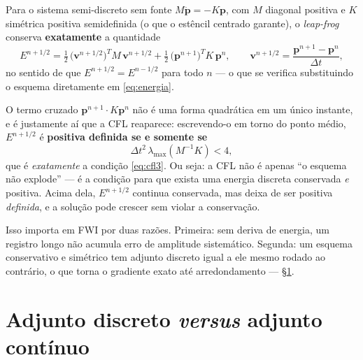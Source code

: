 \documentclass[11pt,a4paper,oneside]{report}
\begin{document}
\begin{derivacao}
Para o sistema semi-discreto sem fonte $M\ddot{\mathbf{p}} = -K\mathbf{p}$,
com $M$ diagonal positiva e $K$ sim\'etrica positiva semidefinida (o que o
est\^encil centrado garante), o \emph{leap-frog} conserva \textbf{exatamente} a
quantidade
\begin{equation}
E^{n+1/2}
 = \tfrac12\,\bigl(\mathbf{v}^{n+1/2}\bigr)^{T} M\,\mathbf{v}^{n+1/2}
 + \tfrac12\,\bigl(\mathbf{p}^{n+1}\bigr)^{T} K\,\mathbf{p}^{n},
\qquad
\mathbf{v}^{n+1/2} = \frac{\mathbf{p}^{n+1}-\mathbf{p}^{n}}{\Delta t},
\label{eq:energia}
\end{equation}
no sentido de que $E^{n+1/2} = E^{n-1/2}$ para todo $n$ --- o que se verifica
substituindo o esquema diretamente em \eqref{eq:energia}.

O termo cruzado $\mathbf{p}^{n+1}\!\cdot\!K\mathbf{p}^{n}$ n\~ao \'e uma forma
quadr\'atica em um \'unico instante, e \'e justamente a\'i que a CFL reaparece:
escrevendo-o em torno do ponto m\'edio, $E^{n+1/2}$ \'e \textbf{positiva
definida se e somente se}
\[
\Delta t^{2}\,\lambda_{\max}\!\left(M^{-1}K\right) < 4 ,
\]
que \'e \emph{exatamente} a condi\c{c}\~ao \eqref{eq:cfl3}. Ou seja: a CFL
n\~ao \'e apenas ``o esquema n\~ao explode'' --- \'e a condi\c{c}\~ao para que
exista uma energia discreta conservada \emph{e} positiva. Acima dela,
$E^{n+1/2}$ continua conservada, mas deixa de ser positiva \emph{definida}, e a solu\c{c}\~ao
pode crescer sem violar a conserva\c{c}\~ao.

Isso importa em FWI por duas raz\~oes. Primeira: sem deriva de energia, um
registro longo n\~ao acumula erro de amplitude sistem\'atico. Segunda: um
esquema conservativo e sim\'etrico tem adjunto discreto igual a ele mesmo
rodado ao contr\'ario, o que torna o gradiente exato at\'e arredondamento ---
§\ref{sec:disc-adj}.
\end{derivacao}

\section{Adjunto discreto \emph{versus} adjunto cont\'inuo}
\label{sec:disc-adj}
\end{document}
